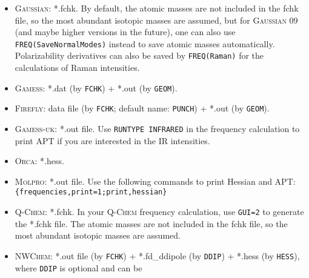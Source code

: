 \documentclass[12pt,english]{extarticle}
\begin{document}

\begin{itemize}
\item \textsc{Gaussian}: *.fchk. By default, the atomic masses are not included in the fchk file, so the most abundant isotopic masses are assumed, but for \textsc{Gaussian} 09 (and maybe higher versions in the future), one can also use \texttt{FREQ(SaveNormalModes)} instead to save atomic masses automatically. Polarizability derivatives can also be saved by \texttt{FREQ(Raman)} for the calculations of Raman intensities.
\item \textsc{Gamess}: *.dat (by \verb|FCHK|) + *.out (by \verb|GEOM|).
\item \textsc{Firefly}: data file (by \verb|FCHK|; default name: \verb|PUNCH|) + *.out (by \verb|GEOM|).
\item \textsc{Gamess-uk}: *.out file. Use \texttt{RUNTYPE INFRARED} in the frequency calculation to
print APT if you are interested in the IR intensities.
\item \textsc{Orca}: *.hess.
\item \textsc{Molpro}: *.out file. Use the following commands to print Hessian and APT: \\
\verb|{frequencies,print=1;print,hessian}|
\item \textsc{Q-Chem}: *.fchk. In your \textsc{Q-Chem} frequency calculation, use \texttt{GUI=2} to
generate the *.fchk file. The atomic masses are not included in the fchk
file, so the most abundant isotopic masses are assumed.
\item \textsc{NWChem}: *.out file (by \verb|FCHK|) + *.fd{\_}ddipole (by \verb|DDIP|) +
*.hess (by \verb|HESS|), where \verb|DDIP| is optional and can be

\end{itemize}
\end{document}
